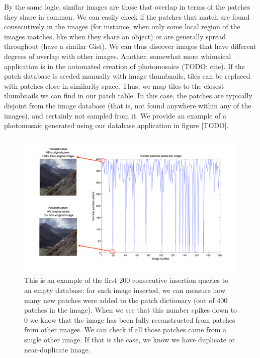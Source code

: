 By the same logic, similar images are those that overlap in terms of the patches they share in common. We can easily check if the patches that match are found consecutively in the images (for instance, when only some local region of the images matches, like when they share an object) or are generally spread throughout (have a similar Gist). We can thus discover images that have different degrees of overlap with other images.
Another, somewhat more whimsical application is in the automated creation of photomosaics (TODO: cite).  If the patch database is seeded manually with image thumbnails, tiles can be replaced with patches close in similarity space.  Thus, we map tiles to the closest thumbnails we can find in our patch table.  In this case, the patches are typically disjoint from the image database (that is, not found anywhere within any of the images), and certainly not sampled from it.  We provide an example of a photomosaic generated using our database application in figure [TODO].

 \begin{figure}
\hspace{-8mm}
\includegraphics[width=1.2\linewidth]{Figures/dupDetection.pdf}
\caption{This is an example of the first 200 consecutive insertion queries to an empty database: for each image inserted, we can measure how many new patches were added to the patch dictionary (out of 400 patches in the image). When we see that this number spikes down to 0 we know that the image has been fully reconstructed from patches from other images. We can check if all those patches came from a single other image. If that is the case, we know we have duplicate or near-duplicate image. }
\label{fig:dups}
\end{figure}

